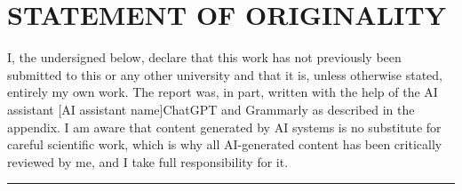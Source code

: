 \documentclass[../report.tex]{subfiles}
\begin{document}
    \section*{STATEMENT OF ORIGINALITY}

 
    \noindent I, the undersigned below, declare that this work has not previously been submitted to this or any other university and that it is, unless otherwise stated, entirely my own work. The report was, in part, written with the help of the AI assistant [AI assistant name]ChatGPT and Grammarly as described in the appendix. I am aware that content generated by AI systems is no substitute for careful scientific work, which is why all AI-generated content has been critically reviewed by me, and I take full responsibility for it.

    \vspace{1cm}

    \hrule width 0.45\linewidth
    \hfill \hspace{0.025\linewidth}
    \hrulefill

\end{document}
